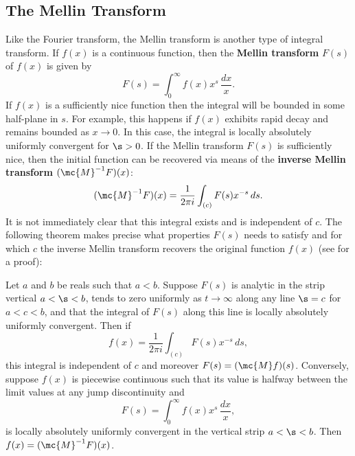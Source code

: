       \subsection*{The Mellin Transform}
        Like the Fourier transform, the Mellin transform is another type of integral transform. If $f(x)$ is a continuous function, then the \textbf{Mellin transform} $F(s)$ of $f(x)$ is given by
        \[
          F(s) = \int_{0}^{\infty}f(x)x^{s}\,\frac{dx}{x}.
        \]
        If $f(x)$ is a sufficiently nice function then the integral will be bounded in some half-plane in $s$. For example, this happens if $f(x)$ exhibits rapid decay and remains bounded as $x \to 0$. In this case, the integral is locally absolutely uniformly convergent for $\s > 0$. If the Mellin transform $F(s)$ is sufficiently nice, then the initial function can be recovered via means of the \textbf{inverse Mellin transform} $(\mc{M}^{-1}F)(x)$:
        \[
          (\mc{M}^{-1}F)(x) = \frac{1}{2\pi i}\int_{(c)}F(s)x^{-s}\,ds.
        \]
        It is not immediately clear that this integral exists and is independent of $c$. The following theorem makes precise what properties $F(s)$ needs to satisfy and for which $c$ the inverse Mellin transform recovers the original function $f(x)$ (see \cite{debnath2002integral} for a proof):

        \begin{theorem}
          Let $a$ and $b$ be reals such that $a < b$. Suppose $F(s)$ is analytic in the strip vertical $a < \s < b$, tends to zero uniformly as $t \to \infty$ along any line $\s = c$ for $a < c < b$, and that the integral of $F(s)$ along this line is locally absolutely uniformly convergent. Then if
          \[
            f(x) = \frac{1}{2\pi i}\int_{(c)}F(s)x^{-s}\,ds,
          \]
          this integral is independent of $c$ and moreover $F(s) = (\mc{M}f)(s)$. Conversely, suppose $f(x)$ is piecewise continuous such that its value is halfway between the limit values at any jump discontinuity and
          \[
            F(s) = \int_{0}^{\infty}f(x)x^{s}\,\frac{dx}{x},
          \]
          is locally absolutely uniformly convergent in the vertical strip $a < \s < b$. Then $f(x) = (\mc{M}^{-1}F)(x)$.
        \end{theorem}
